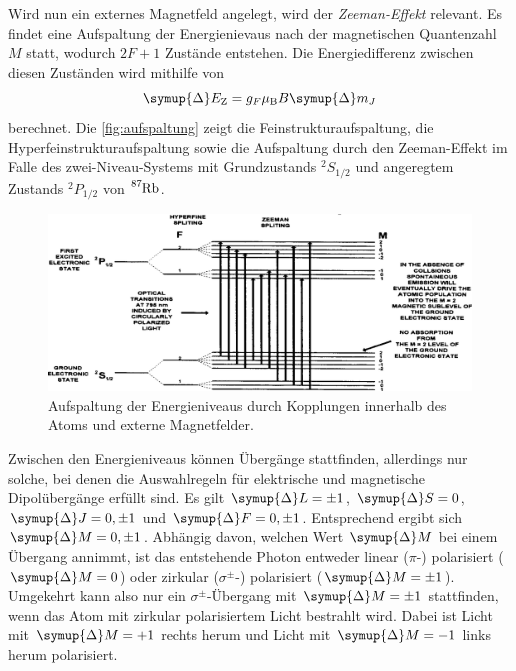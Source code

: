    Wird nun ein externes Magnetfeld angelegt,
    wird der \textit{Zeeman-Effekt} relevant.
    Es findet eine Aufspaltung der Energienievaus nach der magnetischen Quantenzahl $M$ statt,
    wodurch $2F+1$ Zustände entstehen.
    Die Energiedifferenz zwischen diesen Zuständen wird mithilfe von
    \begin{equation}
        \symup{\Delta} E_\text{Z} = g_F \mu_\text{B} B \symup{\Delta} m_J
        \label{eqn:zeemanaufspaltung}
    \end{equation}
    berechnet.
    Die \autoref{fig:aufspaltung} zeigt die Feinstrukturaufspaltung,
    die Hyperfeinstrukturaufspaltung sowie die Aufspaltung durch den Zeeman-Effekt im Falle des zwei-Niveau-Systems mit Grundzustands $^2S_{1/2}$ und angeregtem Zustands $^2P_{1/2}$ von $\ce{^{87}Rb}$.
    \begin{figure}
        \centering
        \includegraphics[width=\textwidth]{content/img/Lit2_Abb_2D-3.png}
        \caption{Aufspaltung der Energieniveaus durch Kopplungen innerhalb des Atoms und externe Magnetfelder.\cite{caltech}}
        \label{fig:aufspaltung}
    \end{figure}
    Zwischen den Energieniveaus können Übergänge stattfinden,
    allerdings nur solche,
    bei denen die Auswahlregeln für elektrische und magnetische Dipolübergänge erfüllt sind.
    Es gilt $\symup{\Delta} L = \pm 1$, $\symup{\Delta} S = 0$, $\symup{\Delta} J = 0, \pm 1$ und $\symup{\Delta} F = 0, \pm 1$.
    Entsprechend ergibt sich $\symup{\Delta} M = 0, \pm 1$.
    Abhängig davon,
    welchen Wert $\symup{\Delta} M$ bei einem Übergang annimmt,
    ist das entstehende Photon entweder linear ($\pi$-) polarisiert ($\symup{\Delta}M = 0$) oder zirkular ($\sigma^{\pm}$-) polarisiert ($\symup{\Delta}M = \pm 1$).
    Umgekehrt kann also nur ein $\sigma^{\pm}$-Übergang mit $\symup{\Delta} M = \pm 1$ stattfinden,
    wenn das Atom mit zirkular polarisiertem Licht bestrahlt wird.
    Dabei ist Licht mit $\symup{\Delta} M = +1$ rechts herum und Licht mit $\symup{\Delta} M =-1$ links herum polarisiert.

